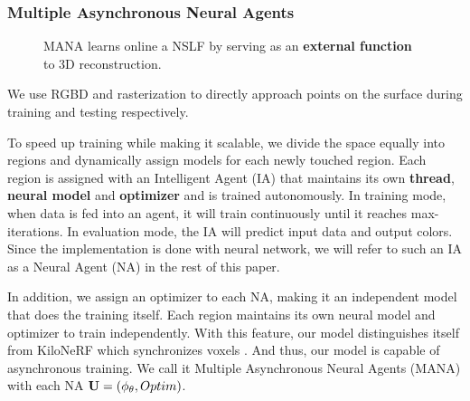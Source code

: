 \subsubsection{Multiple Asynchronous Neural Agents}
\begin{figure}[b!]
	\vspace{-.6cm}
	\centering
	\caption{MANA learns online a NSLF by serving as an \textbf{external function} to 3D reconstruction.}
	\label{fig:workflow}
\end{figure}

We use RGBD and rasterization to directly approach points on the surface during training and testing respectively. 

To speed up training while making it scalable, we divide the space equally into regions and dynamically assign models for each newly touched region. 
Each region is assigned with an Intelligent Agent (IA) that maintains its own \textbf{thread}, \textbf{neural model} and \textbf{optimizer} and is trained autonomously.%
In training mode, when data is fed into an agent, it will train continuously until it reaches max-iterations.
In evaluation mode, the IA will predict input data and output colors. 
Since the implementation is done with neural network,
we will refer to such an IA as a Neural Agent (NA) in the rest of this paper. 

In addition, %
we assign an optimizer to each NA, making it an independent model that does the training itself.
Each region maintains its own neural model and optimizer to train independently.
With this feature, our model distinguishes itself from KiloNeRF which synchronizes voxels . 
And thus, our model is capable of asynchronous training.
We call it Multiple Asynchronous Neural Agents (MANA) with each NA $\mathbf{U}=(\phi_\theta,Optim)$.

